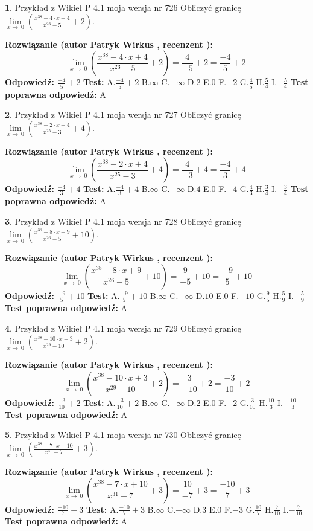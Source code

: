 \documentclass[12pt, a4paper]{article}
\theoremstyle{definition} %
\newtheorem{zad}{}
\newcommand{\zadStart}[1]{\begin{zad}#1\newline}
\newcommand{\zadStop}{\end{zad}}
\newcommand{\rozwStart}[2]{\noindent \textbf{Rozwiązanie (autor #1 , recenzent #2): }\newline}
\newcommand{\rozwStop}{\newline}
\newcommand{\odpStart}{\noindent \textbf{Odpowiedź:}\newline}
\newcommand{\odpStop}{\newline}
\newcommand{\testStart}{\noindent \textbf{Test:}\newline}
\newcommand{\testStop}{\newline}
\newcommand{\kluczStart}{\noindent \textbf{Test poprawna odpowiedź:}\newline}
\newcommand{\kluczStop}{\newline}
\begin{document}
\zadStart{Przykład z Wikieł P 4.1 moja wersja nr 726}
Obliczyć granicę $\lim\limits_{x\to\ 0}(\frac{x^{38}-4 \cdot x +4}{x^{23}-5}+2)$.
\zadStop
\rozwStart{Patryk Wirkus}{}
$$\lim\limits_{x\to\ 0}(\frac{x^{38}-4 \cdot x +4}{x^{23}-5}+2)=\frac{4}{-5}+2=\frac{-4}{5}+2$$
\rozwStop
\odpStart
$\frac{-4}{5}+2$
\odpStop
\testStart
A.$\frac{-4}{5}+2$
B.$\infty$
C.$-\infty$
D.$2$
E.$0$
F.$-2$
G.$\frac{4}{5}$
H.$\frac{5}{4}$
I.$-\frac{5}{4}$
\testStop
\kluczStart
A
\kluczStop



\zadStart{Przykład z Wikieł P 4.1 moja wersja nr 727}
Obliczyć granicę $\lim\limits_{x\to\ 0}(\frac{x^{38}-2 \cdot x +4}{x^{25}-3}+4)$.
\zadStop
\rozwStart{Patryk Wirkus}{}
$$\lim\limits_{x\to\ 0}(\frac{x^{38}-2 \cdot x +4}{x^{25}-3}+4)=\frac{4}{-3}+4=\frac{-4}{3}+4$$
\rozwStop
\odpStart
$\frac{-4}{3}+4$
\odpStop
\testStart
A.$\frac{-4}{3}+4$
B.$\infty$
C.$-\infty$
D.$4$
E.$0$
F.$-4$
G.$\frac{4}{3}$
H.$\frac{3}{4}$
I.$-\frac{3}{4}$
\testStop
\kluczStart
A
\kluczStop



\zadStart{Przykład z Wikieł P 4.1 moja wersja nr 728}
Obliczyć granicę $\lim\limits_{x\to\ 0}(\frac{x^{38}-8 \cdot x +9}{x^{26}-5}+10)$.
\zadStop
\rozwStart{Patryk Wirkus}{}
$$\lim\limits_{x\to\ 0}(\frac{x^{38}-8 \cdot x +9}{x^{26}-5}+10)=\frac{9}{-5}+10=\frac{-9}{5}+10$$
\rozwStop
\odpStart
$\frac{-9}{5}+10$
\odpStop
\testStart
A.$\frac{-9}{5}+10$
B.$\infty$
C.$-\infty$
D.$10$
E.$0$
F.$-10$
G.$\frac{9}{5}$
H.$\frac{5}{9}$
I.$-\frac{5}{9}$
\testStop
\kluczStart
A
\kluczStop



\zadStart{Przykład z Wikieł P 4.1 moja wersja nr 729}
Obliczyć granicę $\lim\limits_{x\to\ 0}(\frac{x^{38}-10 \cdot x +3}{x^{29}-10}+2)$.
\zadStop
\rozwStart{Patryk Wirkus}{}
$$\lim\limits_{x\to\ 0}(\frac{x^{38}-10 \cdot x +3}{x^{29}-10}+2)=\frac{3}{-10}+2=\frac{-3}{10}+2$$
\rozwStop
\odpStart
$\frac{-3}{10}+2$
\odpStop
\testStart
A.$\frac{-3}{10}+2$
B.$\infty$
C.$-\infty$
D.$2$
E.$0$
F.$-2$
G.$\frac{3}{10}$
H.$\frac{10}{3}$
I.$-\frac{10}{3}$
\testStop
\kluczStart
A
\kluczStop



\zadStart{Przykład z Wikieł P 4.1 moja wersja nr 730}
Obliczyć granicę $\lim\limits_{x\to\ 0}(\frac{x^{38}-7 \cdot x +10}{x^{31}-7}+3)$.
\zadStop
\rozwStart{Patryk Wirkus}{}
$$\lim\limits_{x\to\ 0}(\frac{x^{38}-7 \cdot x +10}{x^{31}-7}+3)=\frac{10}{-7}+3=\frac{-10}{7}+3$$
\rozwStop
\odpStart
$\frac{-10}{7}+3$
\odpStop
\testStart
A.$\frac{-10}{7}+3$
B.$\infty$
C.$-\infty$
D.$3$
E.$0$
F.$-3$
G.$\frac{10}{7}$
H.$\frac{7}{10}$
I.$-\frac{7}{10}$
\testStop
\kluczStart
A
\kluczStop
\end{document}
